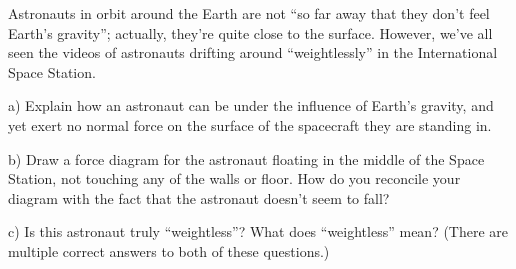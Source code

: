 \documentclass[12pt]{article}
\begin{document}
Astronauts in orbit around the Earth are not ``so far away that they don't feel Earth's gravity'';
actually, they’re quite close to the surface. However, we’ve all seen the videos of astronauts drifting
around ``weightlessly'' in the International Space Station.

a) Explain how an astronaut can be under the influence of Earth's gravity, and yet exert no normal
force on the surface of the spacecraft they are standing in.
%

\vspace{2in}

b) Draw a force diagram for the astronaut floating in the middle of the Space Station, not touching
any of the walls or floor. How do you reconcile your diagram with the fact that the astronaut
doesn't seem to fall?
%
%
\vspace{2in}

c) Is this astronaut truly ``weightless''? What does ``weightless'' mean? (There are multiple correct answers to both of these questions.)
%
%
%
%
%
\end{document}
